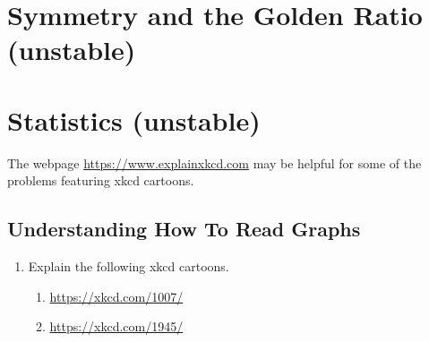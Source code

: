 \documentclass[11pt, letterpaper]{article}
\begin{document}
\newpage

\section{Symmetry and the Golden Ratio (unstable) }

\newpage

\section{Statistics (unstable) }
The webpage \url{https://www.explainxkcd.com} may be helpful for some of the problems featuring xkcd cartoons.
\subsection{Understanding How To Read Graphs}

\begin{enumerate}
	\item Explain the following xkcd cartoons.
	\begin{enumerate}
		\item \url{https://xkcd.com/1007/}
		\item \url{https://xkcd.com/1945/}
	\end{enumerate}
\end{enumerate}
\end{document}
